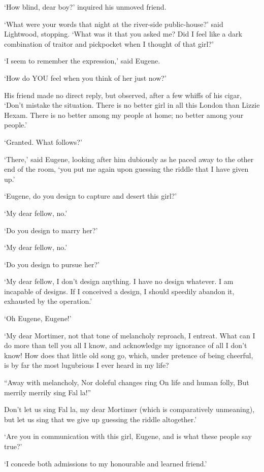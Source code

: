 ‘How blind, dear boy?’ inquired his unmoved friend.

‘What were your words that night at the river-side public-house?’ said
Lightwood, stopping. ‘What was it that you asked me? Did I feel like a
dark combination of traitor and pickpocket when I thought of that girl?’

‘I seem to remember the expression,’ said Eugene.

‘How do YOU feel when you think of her just now?’

His friend made no direct reply, but observed, after a few whiffs of his
cigar, ‘Don’t mistake the situation. There is no better girl in all this
London than Lizzie Hexam. There is no better among my people at home; no
better among your people.’

‘Granted. What follows?’

‘There,’ said Eugene, looking after him dubiously as he paced away to
the other end of the room, ‘you put me again upon guessing the riddle
that I have given up.’

‘Eugene, do you design to capture and desert this girl?’

‘My dear fellow, no.’

‘Do you design to marry her?’

‘My dear fellow, no.’

‘Do you design to pursue her?’

‘My dear fellow, I don’t design anything. I have no design whatever.
I am incapable of designs. If I conceived a design, I should speedily
abandon it, exhausted by the operation.’

‘Oh Eugene, Eugene!’

‘My dear Mortimer, not that tone of melancholy reproach, I entreat. What
can I do more than tell you all I know, and acknowledge my ignorance
of all I don’t know! How does that little old song go, which, under
pretence of being cheerful, is by far the most lugubrious I ever heard
in my life?

     “Away with melancholy,
     Nor doleful changes ring
     On life and human folly,
     But merrily merrily sing
                              Fal la!”

Don’t let us sing Fal la, my dear Mortimer (which is comparatively
unmeaning), but let us sing that we give up guessing the riddle
altogether.’

‘Are you in communication with this girl, Eugene, and is what these
people say true?’

‘I concede both admissions to my honourable and learned friend.’

